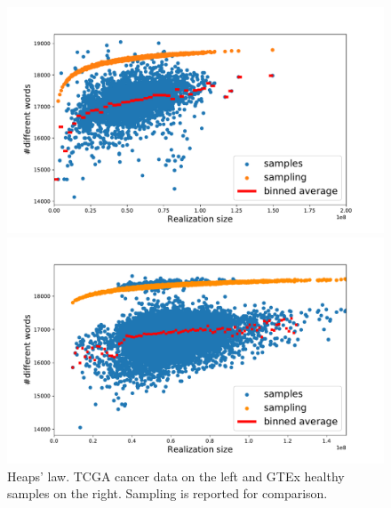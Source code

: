 \begin{figure}[htb!]
\begin{minipage}{0.5\textwidth}
    \centering
    \includegraphics[width=0.95\linewidth]{pictures/structure/tcga/heaps_null.pdf}
    \end{minipage}
\hspace{2mm}
\begin{minipage}{0.5\textwidth}
    \centering
    \includegraphics[width=0.95\linewidth]{pictures/structure/gtex/heaps_null.pdf}
    \end{minipage}
\caption{Heaps' law. TCGA cancer data on the left and GTEx healthy samples on the right. Sampling is reported for comparison.}
\label{fig:structure/heaps_null}
\end{figure}

